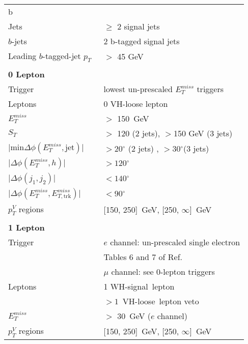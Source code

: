 \begin{table}[ht]
\begin{center}
\begin{tabular}{l l} 

b\toprule
\multicolumn{2}{l}{\textbf{Common Selections}}\\

Jets & $\geq$  2 signal jets  \\
$b$-jets &  2 b-tagged signal jets \\
Leading $b$-tagged-jet $p_T$\  & $>$ 45 GeV \\

  &\\
\multicolumn{2}{l}{\textbf{0 Lepton}} \\

Trigger & lowest un-prescaled $E_T^{miss}$ triggers \\
Leptons & 0 VH-loose lepton \\
$E_T^{miss}$ & $>$ 150~GeV  \\

$S_T$ & $>$ 120 (2 jets), $>$150 GeV (3 jets)  \\
$\lvert \text{min} \Delta \phi (E_T^{miss}, \text{jet}) \rvert$ & $> 20\ensuremath{^\circ}$ (2 jets) , $> 30\ensuremath{^\circ}$(3 jets) \\
  $\lvert \Delta\phi(E_T^{miss}, h) \rvert$ & $> 120\ensuremath{^\circ}$ \\
$\lvert \Delta\phi(j_1, j_2) \rvert$ & $< 140\ensuremath{^\circ}$ \\
$\lvert \Delta\phi(E_T^{miss}, E_{T, \text{trk}}^{miss}) \rvert$ & $< 90\ensuremath{^\circ}$ \\
$p_T^V$ regions & [150, 250]~GeV, [250, $\infty$]~GeV  \\

&\\

\multicolumn{2}{l}{\textbf{1 Lepton}} \\

Trigger &  $e$ channel: un-prescaled single electron \\
        & Tables 6 and 7 of Ref.~\cite{VHobjectsupportnote}\\
	    & $\mu$ channel: see 0-lepton triggers \\
Leptons & 1 WH-signal\ lepton \\
        &  $>1$~VH-loose\ lepton veto \\
$E_T^{miss}$   & $>$ 30~GeV ($e$ channel) \\
$p_T^{V}$ regions & [150, 250]~GeV, [250, $\infty$]~GeV  \\ 


\end{tabular}
\end{center}
\end{table}
